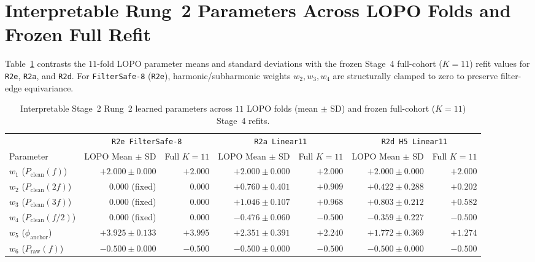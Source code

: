 \section{Interpretable Rung~2 Parameters Across LOPO Folds and Frozen Full Refit}
\label{app:sec_rung2_weights}

Table~\ref{tab:app_rung2_weights} contrasts the $11$-fold LOPO parameter means and standard
deviations with the frozen Stage~4 full-cohort ($K=11$) refit values for \texttt{R2e}, \texttt{R2a},
and \texttt{R2d}. For \texttt{FilterSafe-8} (\texttt{R2e}), harmonic/subharmonic weights $w_2, w_3,
w_4$ are structurally clamped to zero to preserve filter-edge equivariance.

\begin{table}[htbp]
  \centering
  \scriptsize
  \setlength{\tabcolsep}{3.5pt}
  \caption{Interpretable Stage~2 Rung~2 learned parameters across $11$ LOPO folds (mean $\pm$ SD) and
  frozen full-cohort ($K=11$) Stage~4 refits.}
  \label{tab:app_rung2_weights}
  \begin{tabularx}{\textwidth}{@{}>{\raggedright\arraybackslash}X rr rr rr@{}}
    \toprule
    & \multicolumn{2}{c}{\texttt{R2e FilterSafe-8}} & \multicolumn{2}{c}{\texttt{R2a Linear11}} & \multicolumn{2}{c}{\texttt{R2d H5 Linear11}} \\
    \cmidrule(lr){2-3} \cmidrule(lr){4-5} \cmidrule(l){6-7}
    Parameter & LOPO Mean $\pm$ SD & Full $K=11$ & LOPO Mean $\pm$ SD & Full $K=11$ & LOPO Mean $\pm$ SD & Full $K=11$ \\
    \midrule
    $w_1$ ($P_{\mathrm{clean}}(f)$) & $+2.000 \pm 0.000$ & $+2.000$ & $+2.000 \pm 0.000$ & $+2.000$ & $+2.000 \pm 0.000$ & $+2.000$ \\
    $w_2$ ($P_{\mathrm{clean}}(2f)$) & $0.000$ (fixed) & $0.000$ & $+0.760 \pm 0.401$ & $+0.909$ & $+0.422 \pm 0.288$ & $+0.202$ \\
    $w_3$ ($P_{\mathrm{clean}}(3f)$) & $0.000$ (fixed) & $0.000$ & $+1.046 \pm 0.107$ & $+0.968$ & $+0.803 \pm 0.212$ & $+0.582$ \\
    $w_4$ ($P_{\mathrm{clean}}(f/2)$) & $0.000$ (fixed) & $0.000$ & $-0.476 \pm 0.060$ & $-0.500$ & $-0.359 \pm 0.227$ & $-0.500$ \\
    $w_5$ ($\phi_{\mathrm{anchor}}$) & $+3.925 \pm 0.133$ & $+3.995$ & $+2.351 \pm 0.391$ & $+2.240$ & $+1.772 \pm 0.369$ & $+1.274$ \\
    $w_6$ ($P_{\mathrm{raw}}(f)$) & $-0.500 \pm 0.000$ & $-0.500$ & $-0.500 \pm 0.000$ & $-0.500$ & $-0.500 \pm 0.000$ & $-0.500$ \\

\end{tabularx}
\end{table}
